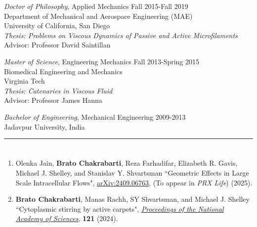 \documentclass[10pt]{res} %
\begin{document}
\begin{resume}
\vspace*{4mm} %
{\sl Doctor of Philosophy}, 
Applied Mechanics   \hfill Fall 2015-Fall 2019 \\ 
Department of Mechanical and Aerospace Engineering (MAE) \\ 
University of California, San Diego \\
\textit{Thesis: Problems on Viscous Dynamics of Passive and Active Microfilaments} \\
Advisor: Professor David Saintillan 

 
{\sl Master of Science}, Engineering Mechanics \hfill Fall 2013-Spring 2015 \\
Biomedical Engineering and Mechanics \\ 
Virginia Tech \\
\textit{Thesis: Catenaries in Viscous Fluid} \\
Advisor: Professor James Hanna 


{\sl Bachelor of Engineering}, Mechanical Engineering \hfill 2009-2013 \\
Jadavpur University, India 

\vspace*{-3mm}


\noindent\rule{\textwidth}{0.6pt}
\vspace*{-10mm}
\section{}
\vspace*{7mm} %
\begin{enumerate}[topsep=0pt,itemsep= 1ex]
	
\item  Olenka Jain, \textbf{Brato Chakrabarti}, Reza Farhadifar, Elizabeth R. Gavis, Michael J. Shelley, and Stanislav Y. Shvartsman ``Geometric Effects in Large Scale Intracellular Flows", \href{https://doi.org/10.48550/arXiv.2409.06763}{arXiv:2409.06763}, (To appear in \textit{PRX Life}) (2025). 

	
\item  \textbf{Brato Chakrabarti}, Manas Rachh, SY Shvartsman, and  Michael J. Shelley ``Cytoplasmic stirring by active carpets",  \href{https://doi.org/10.1073/pnas.2405114121}{\textit{Proceedings of the National Academy of Sciences}},  \textbf{121} (2024).
	

\end{enumerate}
\end{resume}
\end{document}
